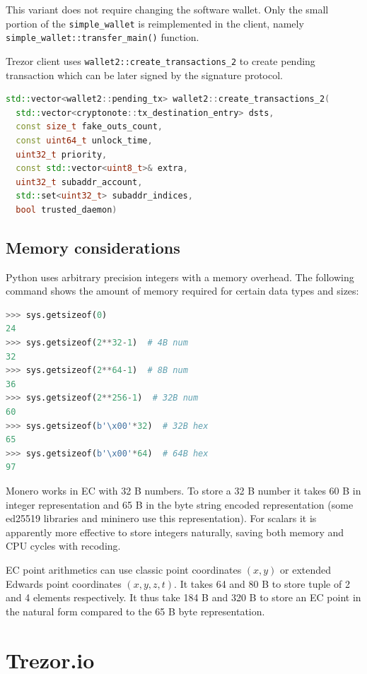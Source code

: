 \documentclass[]{article}
\begin{document}
This variant does not require changing the software wallet.
Only the small portion of the \verb|simple_wallet| is reimplemented in the client, namely \verb|simple_wallet::transfer_main()| function.

Trezor client uses \verb|wallet2::create_transactions_2| to create pending transaction which can be later signed by the signature protocol.

\begin{lstlisting}[language=c++]
std::vector<wallet2::pending_tx> wallet2::create_transactions_2(
  std::vector<cryptonote::tx_destination_entry> dsts, 
  const size_t fake_outs_count, 
  const uint64_t unlock_time, 
  uint32_t priority, 
  const std::vector<uint8_t>& extra, 
  uint32_t subaddr_account, 
  std::set<uint32_t> subaddr_indices, 
  bool trusted_daemon)
\end{lstlisting}


\subsection{Memory considerations}
Python uses arbitrary precision integers with a memory overhead.
The following command shows the amount of memory required for certain data types and sizes:
\begin{lstlisting}[language=python]
>>> sys.getsizeof(0)
24
>>> sys.getsizeof(2**32-1)  # 4B num
32
>>> sys.getsizeof(2**64-1)  # 8B num
36
>>> sys.getsizeof(2**256-1)  # 32B num
60
>>> sys.getsizeof(b'\x00'*32)  # 32B hex
65
>>> sys.getsizeof(b'\x00'*64)  # 64B hex
97
\end{lstlisting}

Monero works in EC with 32 B numbers. To store a 32 B number it takes 60 B in integer representation and 65 B in the byte string encoded representation (some ed25519 libraries and mininero use this representation). For scalars it is apparently more effective to store integers naturally, saving both memory and CPU cycles with recoding.

EC point arithmetics can use classic point coordinates $(x, y)$ or extended Edwards point coordinates $(x,y,z,t)$. It takes 64 and 80 B to store tuple of 2 and 4 elements respectively. It thus take 184 B and 320 B to store an EC point in the natural form compared to the 65 B byte representation.


\section{Trezor.io}
\end{document}
